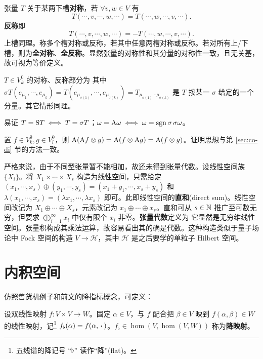 \begin{definition}
    张量 $T$ 关于某两下槽\textbf{对称}，若 $\forall v,w\in V$ 有
    \[
    T(\cdots,v,\cdots,w,\cdots)=T(\cdots,w,\cdots,v,\cdots).
    \]
    \textbf{反称}即
    \[
    T(\cdots,v,\cdots,w,\cdots)=-T(\cdots,w,\cdots,v,\cdots).
    \]
    上槽同理。称多个槽对称或反称，若其中任意两槽对称或反称。若对所有上/下槽，则为\textbf{全对称}、\textbf{全反称}。显然张量的对称性和其分量的对称性一致，且无关基，故可视为等价定义。

    $T\in V^0_k$ 的对称、反称部分为
其中 $\sigma T(e_{\mu_1},\cdots,e_{\mu_k})=T(e_{\mu_{\sigma(1)}},\cdots,e_{\mu_{\sigma(k)}})=T_{\mu_{\sigma(1)}\cdots\mu_{\sigma(k)}}$ 是 $T$ 按某一 $\sigma$ 给定的一个分量。其它情形同理。
\end{definition}

\begin{theorem}
    易证 $T=\S T\iff T=\sigma T$；$\omega=\A\omega\iff\omega=\sgn\sigma\,\sigma\omega$。
\end{theorem}

\begin{theorem}
    置 $f\in V^0_k,g\in V^0_l$，则 $\A(\A f\otimes g)=\A(f\otimes\A g)=\A(f\otimes g)$。证明思想与第 \ref{sec:co-di} 节的方法一致。
\end{theorem}

严格来说，由于不同型张量暂不能相加，故还未得到张量代数。设线性空间族 $\{X_i\}$。将 $X_1\times\cdots\times X_s$ 构造为线性空间，只需给定 $(x_1,\cdots,x_s)\oplus(y_1,\cdots,y_s)=(x_1+y_1,\cdots,x_s+y_s)$ 和 $\lambda(x_1,\cdots,x_s)=(\lambda x_1,\cdots,\lambda x_s)$ 即可。此即线性空间的\textbf{直和}(direct sum)。线性空间改记为 $X_1\oplus\cdots\oplus X_s$，元素改记为 $x_1\oplus\cdots\oplus x_s$。直和可从 $s\in\N$ 推广至可数无穷，但要求 $\bigoplus_{i=1}^\infty x_i$ 中仅有限个 $x_i$ 非零。\textbf{张量代数}定义为
它显然是无穷维线性空间。张量积构成其乘法运算，故容易看出其的确是代数。这种构造类似于量子场论中 Fock 空间的构造 $V\to\mathscr H$，其中 $\mathscr H$ 是之后要学的单粒子 Hilbert 空间。

\section{内积空间}

仿照售货机例子和前文的降指标概念，可定义：

\begin{definition}
    设双线性映射 $f:V\times V\to W$。固定 $\alpha\in V$，与 $f$ 配合把 $\beta\in V$ 映到 $f(\alpha,\beta)\in W$ 的线性映射，记\footnote{五线谱的降记号 “$\flat$” 读作“降”(flat)。} $f_\flat(\alpha)=f(\alpha,\oo)$。$f_\flat\in\hom(V,\hom(V,W))$ 称为\textbf{降映射}。
\end{definition}


